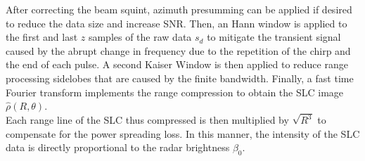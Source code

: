 After correcting the beam squint, azimuth presumming can be applied if desired to reduce the data size and increase SNR. Then, an Hann window is applied to the first and last $z$ samples of the raw data $s_{d}$ to mitigate the transient signal caused by the abrupt change in frequency due to the repetition of the chirp and the end of each pulse. A second Kaiser Window is then applied to reduce range processing sidelobes that are caused by the finite bandwidth. Finally, a fast time Fourier transform implements the range compression to obtain the SLC image $\hat{\rho}\left(R, \theta\right)$.\\ Each range line of the SLC thus compressed is then multiplied by $\sqrt{R^3}$ to compensate for the power spreading loss. In this manner, the intensity of the SLC data is directly proportional to the radar brightness $\beta_{0}$\cite{Raney1994}. 

